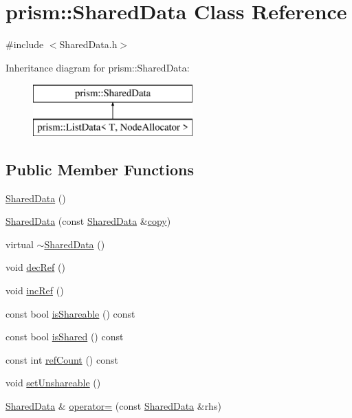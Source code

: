 \hypertarget{classprism_1_1_shared_data}{}\section{prism\+:\+:Shared\+Data Class Reference}
\label{classprism_1_1_shared_data}


{\ttfamily \#include $<$Shared\+Data.\+h$>$}

Inheritance diagram for prism\+:\+:Shared\+Data\+:\begin{figure}[H]
\begin{center}
\leavevmode
\includegraphics[height=2.000000cm]{classprism_1_1_shared_data}
\end{center}
\end{figure}
\subsection*{Public Member Functions}
\begin{DoxyCompactItemize}
\item 
\hyperlink{classprism_1_1_shared_data_a68d7aab69703ca6152731f1e041d6949}{Shared\+Data} ()
\item 
\hyperlink{classprism_1_1_shared_data_a90f3a23c943c077a2d23776ba0b207c1}{Shared\+Data} (const \hyperlink{classprism_1_1_shared_data}{Shared\+Data} \&\hyperlink{namespaceprism_ae776f4cd825f79e7af1cf6ee1d90a209}{copy})
\item 
virtual \hyperlink{classprism_1_1_shared_data_a8ededcc3f4eb86dcd47d271bd24aff0b}{$\sim$\+Shared\+Data} ()
\item 
void \hyperlink{classprism_1_1_shared_data_a270cf0cca02293714175d70acd92f049}{dec\+Ref} ()
\item 
void \hyperlink{classprism_1_1_shared_data_ae389431d573a0131b368c60531006fd2}{inc\+Ref} ()
\item 
const bool \hyperlink{classprism_1_1_shared_data_a2c995e732a31d8f9a29c2fd46e0256ff}{is\+Shareable} () const 
\item 
const bool \hyperlink{classprism_1_1_shared_data_a2b919077f094e7d8970721b77677b584}{is\+Shared} () const 
\item 
const int \hyperlink{classprism_1_1_shared_data_a4886256c18ff603dece3cad4fb4f579b}{ref\+Count} () const 
\item 
void \hyperlink{classprism_1_1_shared_data_a09445f57e7dea60a37477a36d74365ac}{set\+Unshareable} ()
\item 
\hyperlink{classprism_1_1_shared_data}{Shared\+Data} \& \hyperlink{classprism_1_1_shared_data_a0edaec2979f24e9b7c11eb80cfa630bc}{operator=} (const \hyperlink{classprism_1_1_shared_data}{Shared\+Data} \&rhs)
\end{DoxyCompactItemize}


